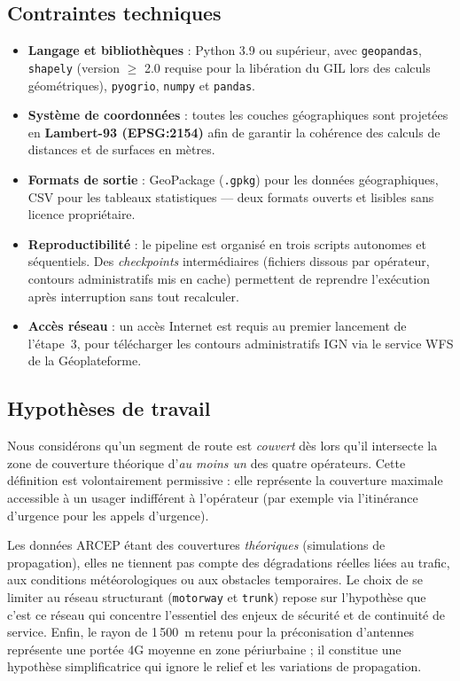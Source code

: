 \documentclass[11pt,a4paper]{article}
\begin{document}
\subsection{Contraintes techniques}

\begin{itemize}
  \item \textbf{Langage et bibliothèques} : Python 3.9 ou supérieur, avec \texttt{geopandas}, \texttt{shapely} (version $\geq$ 2.0 requise pour la libération du GIL lors des calculs géométriques), \texttt{pyogrio}, \texttt{numpy} et \texttt{pandas}.
  \item \textbf{Système de coordonnées} : toutes les couches géographiques sont projetées en \textbf{Lambert-93 (EPSG:2154)} afin de garantir la cohérence des calculs de distances et de surfaces en mètres.
  \item \textbf{Formats de sortie} : GeoPackage (\texttt{.gpkg}) pour les données géographiques, CSV pour les tableaux statistiques — deux formats ouverts et lisibles sans licence propriétaire.
  \item \textbf{Reproductibilité} : le pipeline est organisé en trois scripts autonomes et séquentiels. Des \emph{checkpoints} intermédiaires (fichiers dissous par opérateur, contours administratifs mis en cache) permettent de reprendre l'exécution après interruption sans tout recalculer.
  \item \textbf{Accès réseau} : un accès Internet est requis au premier lancement de l'étape~3, pour télécharger les contours administratifs IGN via le service WFS de la Géoplateforme.
\end{itemize}

\subsection{Hypothèses de travail}

Nous considérons qu'un segment de route est \emph{couvert} dès lors qu'il intersecte la zone de couverture théorique d'\emph{au moins un} des quatre opérateurs. Cette définition est volontairement permissive : elle représente la couverture maximale accessible à un usager indifférent à l'opérateur (par exemple via l'itinérance d'urgence pour les appels d'urgence).

Les données ARCEP étant des couvertures \emph{théoriques} (simulations de propagation), elles ne tiennent pas compte des dégradations réelles liées au trafic, aux conditions météorologiques ou aux obstacles temporaires. Le choix de se limiter au réseau structurant (\texttt{motorway} et \texttt{trunk}) repose sur l'hypothèse que c'est ce réseau qui concentre l'essentiel des enjeux de sécurité et de continuité de service. Enfin, le rayon de 1\,500~m retenu pour la préconisation d'antennes représente une portée 4G moyenne en zone périurbaine ; il constitue une hypothèse simplificatrice qui ignore le relief et les variations de propagation.
\end{document}
